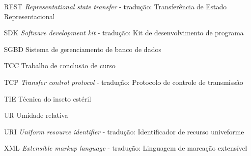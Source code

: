 \begin{siglas}
	\item[REST]     \textit{Representational state transfer} - tradução: Transferência de Estado Representacional
	\item[SDK]		\textit{Software development kit} - tradução: Kit de desenvolvimento de programa
	\item[SGBD]		Sistema de gerenciamento de banco de dados
	\item[TCC]      Trabalho de conclusão de curso
    \item[TCP]		\textit{Transfer control protocol} - tradução: Protocolo de controle de transmissão 
	\item[TIE]		Técnica do inseto estéril
	\item[UR]	    Umidade relativa
	\item[URI]	    \textit{Uniform resource identifier} - tradução: Identificador de recurso univeforme
	\item[XML]      \textit{Extensible markup language} - tradução: Linguagem de marcação extensível
    
\end{siglas}

\tableofcontents*
\cleardoublepage
